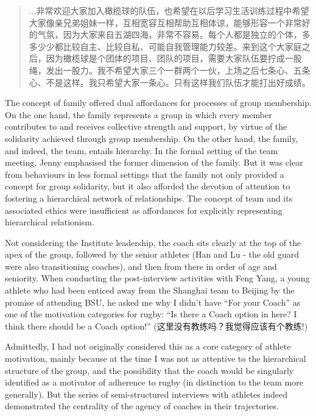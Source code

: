 \begin{CJK}{UTF8}{gbsn}
  \begin{quotation}
    ...非常欢迎大家加入橄榄球的队伍，也希望在以后学习生活训练过程中希望大家像亲兄弟姐妹一样，互相宽容互相帮助互相体谅，能够形容一个非常好的气氛，因为大家来自五湖四海，非常不容易。每个人都是独立的个体，多多少少都比较自主、比较自私、可能自我管理能力较差。来到这个大家庭之后，因为橄榄球是个团体的项目、团队的项目，需要大家队伍要拧成一股绳，发出一股力。我不希望大家三个一群两个一伙，上场之后七条心、五条心、不是这样。我只希望大家一条心。只有这样我们队伍才能打出好成绩。
  \end{quotation}


  The concept of family offered dual affordances for processes of group membership.  On the one hand, the family represents a group in which every member contributes to and receives collective strength and support, by virtue of the solidarity achieved through group membership.  On the other hand, the family, and indeed, the team,  entails hierarchy.  In the formal setting of the team meeting, Jenny emphasised the former dimension of the family.  But it was clear from behaviours in less formal settings that the family not only provided a concept for group solidarity, but it   also afforded the devotion of attention to fostering a hierarchical network of relationships.  The concept of team and its associated ethics were insufficient as  affordances for explicitly representing hierarchical relationism.

  Not considering the Institute leadership, the coach sits clearly at the top of the apex of the group, followed by the senior athletes (Han and Lu - the old guard were also transitioning coaches), and then from there in order of age and seniority.  When conducting the post-interview activities with Feng Yang, a young athlete who had been enticed away from the Shanghai team to Beijing by the promise of attending BSU, he asked me why I didn't have ``For your Coach'' as one of the motivation categories for rugby:  ``Is there a Coach option in here?  I think there should be a Coach option!'' (这里没有教练吗？我觉得应该有个教练!)

  Admittedly, I had not originally considered this as a core category of athlete motivation, mainly because at the time I was not as attentive to the hierarchical structure of the group, and the possibility that the coach would be singularly identified as a motivator of adherence to rugby (in distinction to the team more generally).  But the series of semi-structured interviews with athletes indeed demonstrated the centrality of the agency of coaches in their trajectories.


\end{CJK}
